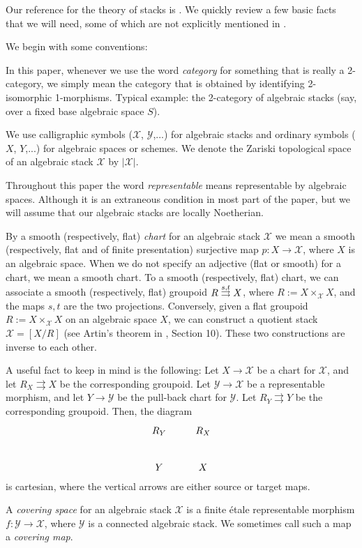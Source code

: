 \documentclass{amsart}
\theoremstyle{definition}
\theoremstyle{remark}
\theoremstyle{remark}
\newcommand{\X}{\mathcal{X}}
\newcommand{\Y}{\mathcal{Y}}
\newcommand{\x}{\times}
\newcommand{\st}[1]{\stackrel{#1}{\rightrightarrows}}
\def\smashedst{\setbox0=\hbox{$\rightrightarrows$}\ht0=4pt\box0}
\newcommand{\sst}[1]{\stackrel{#1}{\smashedst}}
\let\:=\colon
\begin{document}
Our reference for the theory of stacks is \cite{LM}. We quickly
review a few basic facts that we will need, some of which are not
explicitly mentioned in \cite{LM}.

We begin with some conventions:

In this paper, whenever we use the word {\it category} for
something that is really a 2-category, we simply mean the category
that is obtained by identifying 2-isomorphic 1-morphisms. Typical
example: the 2-category of algebraic stacks (say, over a fixed
base algebraic space $S$).

We use calligraphic symbols ($\X$, $\Y$,...) for algebraic stacks
and ordinary symbols  ($X$, $Y$,...) for algebraic spaces or
schemes. We denote the Zariski topological space of an algebraic
stack $\X$ by $|\X|$.

Throughout this paper the word {\em representable} means
representable by algebraic spaces. Although it is an extraneous
condition in most part of the paper, but we will assume that our
algebraic stacks are locally Noetherian.

By a smooth (respectively, flat) {\em  chart} for an algebraic
stack $\X$ we mean a smooth (respectively, flat and of finite
presentation) surjective map $p \: X \to \X$, where $X$ is an
algebraic space. When we do not specify an adjective (flat or
smooth) for a chart, we mean a smooth chart. To a smooth
(respectively, flat) chart, we can associate a smooth
(respectively, flat) groupoid $R \sst{s,t} X$, where $R:=X
\x_{\X}X$, and the maps $s,t$ are the two projections. Conversely,
given a  flat groupoid $R:=X \x_{\X}X$ on an algebraic space $X$,
we can construct a quotient stack $\X=[X/R]$ (see Artin's theorem
in \cite{LM}, Section 10). These two constructions are inverse to
each other.

A useful fact to keep in mind is the following: Let $X \to \X$ be
a chart for $\X$, and let $R_X \st{} X$ be the corresponding
groupoid. Let $\Y \to \X$ be a representable morphism, and let $Y
\to \Y$ be the pull-back chart for $\Y$. Let $R_Y \st{} Y$ be the
corresponding groupoid. Then, the  diagram
\begin{equation}{\label{0}}
\xymatrix{ R_Y \ar[r] \ar[d] & R_X \ar[d] \\
             Y \ar[r]        & X }
\end{equation}
\noindent is cartesian, where the vertical arrows are either
source or target maps.

A {\em covering space} for an algebraic stack $\X$ is a finite
\'{e}tale representable morphism $f \: \Y \to \X$, where $\Y$ is a
connected algebraic stack. We sometimes call such a map  a {\em
covering map}.
\end{document}
